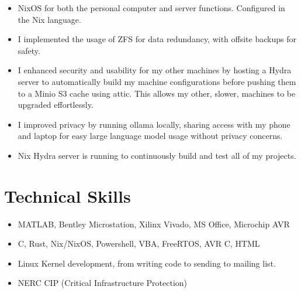 \documentclass{lsanche_cv}
\begin{document}
\begin{itemize}
\item NixOS for both the personal computer and server functions. Configured in the Nix language.
\item I implemented the usage of ZFS for data redundancy, with offsite backups for safety.
\item I enhanced security and usability for my other machines by hosting a Hydra server to automatically build my machine configurations before pushing them to a Minio S3 cache using attic. This allows my other, slower, machines to be upgraded effortlessly.
\item I improved privacy by running ollama locally, sharing access with my phone and laptop for easy large language model usage without privacy concerns.
\item Nix Hydra server is running to continuously build and test all of my projects.
\end{itemize}

\section{Technical Skills}
\begin{itemize}
\item MATLAB, Bentley Microstation, Xilinx Vivado, MS Office, Microchip AVR
\item C, Rust, Nix/NixOS, Powershell, VBA, FreeRTOS, AVR C, HTML
\item Linux Kernel development, from writing code to sending to mailing list.
\item NERC CIP (Critical Infrastructure Protection)
\end{itemize}
\end{document}
